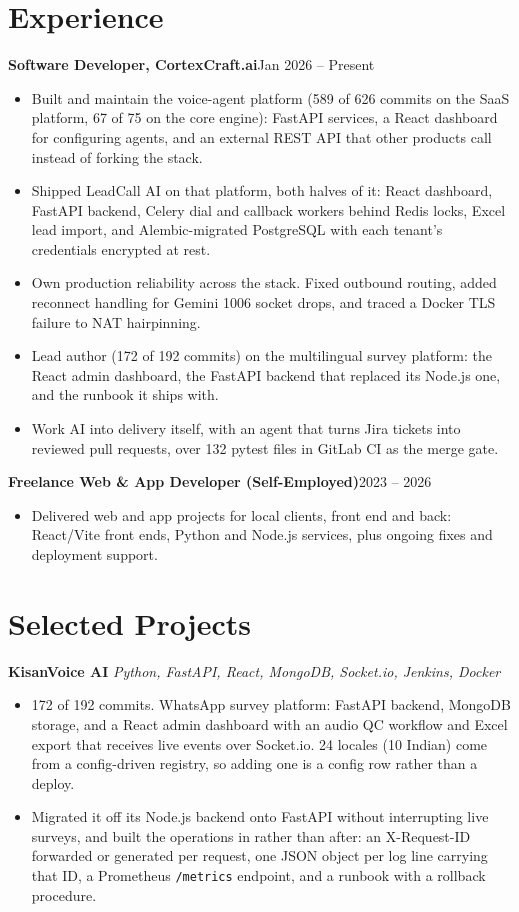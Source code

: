 \documentclass[10pt,a4paper]{article}
\newcommand{\entry}[2]{\textbf{#1}\hfill{#2}\par}
\begin{document}
\section{Experience}
\entry{Software Developer, CortexCraft.ai}{Jan 2026 -- Present}
\begin{itemize}
  \item Built and maintain the voice-agent platform (589 of 626 commits on the SaaS platform, 67 of 75
        on the core engine): FastAPI services, a React dashboard for configuring agents, and an
        external REST API that other products call instead of forking the stack.
  \item Shipped LeadCall AI on that platform, both halves of it: React dashboard, FastAPI backend,
        Celery dial and callback workers behind Redis locks, Excel lead import, and Alembic-migrated
        PostgreSQL with each tenant's credentials encrypted at rest.
  \item Own production reliability across the stack. Fixed outbound routing, added reconnect handling
        for Gemini 1006 socket drops, and traced a Docker TLS failure to NAT hairpinning.
  \item Lead author (172 of 192 commits) on the multilingual survey platform: the React admin
        dashboard, the FastAPI backend that replaced its Node.js one, and the runbook it ships with.
  \item Work AI into delivery itself, with an agent that turns Jira tickets into reviewed pull
        requests, over 132 pytest files in GitLab CI as the merge gate.
\end{itemize}

\vspace{1pt}
\entry{Freelance Web \& App Developer (Self-Employed)}{2023 -- 2026}
\begin{itemize}
  \item Delivered web and app projects for local clients, front end and back: React/Vite front ends,
        Python and Node.js services, plus ongoing fixes and deployment support.
\end{itemize}

\section{Selected Projects}
\textbf{KisanVoice AI} \textit{Python, FastAPI, React, MongoDB, Socket.io, Jenkins, Docker}
\begin{itemize}
  \item 172 of 192 commits. WhatsApp survey platform: FastAPI backend, MongoDB storage, and a React
        admin dashboard with an audio QC workflow and Excel export that receives live events over
        Socket.io. 24 locales (10 Indian) come from a config-driven registry, so adding one is a
        config row rather than a deploy.
  \item Migrated it off its Node.js backend onto FastAPI without interrupting live surveys, and built
        the operations in rather than after: an X-Request-ID forwarded or generated per request, one
        JSON object per log line carrying that ID, a Prometheus \texttt{/metrics} endpoint, and a
        runbook with a rollback procedure.
\end{itemize}
\end{document}
